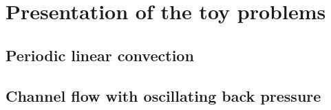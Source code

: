 \chapter{Presentation of the toy problems}
\label{cha:toy_problems}

\chabstract{}

\minitoc
\newpage


\section{Periodic linear convection}
\label{sec:toy_convection}


\section{Channel flow with oscillating back pressure}
\label{sec:toy_channel}


\chconclu{}
